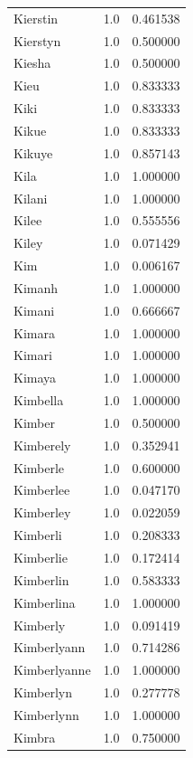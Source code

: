 \documentclass[
  letterpaper,
  DIV=11,
  numbers=noendperiod]{scrreprt}
\begin{document}
\begin{tabular}{lrr}
Kierstin        &   1.0 &   0.461538 \\
Kierstyn        &   1.0 &   0.500000 \\
Kiesha          &   1.0 &   0.500000 \\
Kieu            &   1.0 &   0.833333 \\
Kiki            &   1.0 &   0.833333 \\
Kikue           &   1.0 &   0.833333 \\
Kikuye          &   1.0 &   0.857143 \\
Kila            &   1.0 &   1.000000 \\
Kilani          &   1.0 &   1.000000 \\
Kilee           &   1.0 &   0.555556 \\
Kiley           &   1.0 &   0.071429 \\
Kim             &   1.0 &   0.006167 \\
Kimanh          &   1.0 &   1.000000 \\
Kimani          &   1.0 &   0.666667 \\
Kimara          &   1.0 &   1.000000 \\
Kimari          &   1.0 &   1.000000 \\
Kimaya          &   1.0 &   1.000000 \\
Kimbella        &   1.0 &   1.000000 \\
Kimber          &   1.0 &   0.500000 \\
Kimberely       &   1.0 &   0.352941 \\
Kimberle        &   1.0 &   0.600000 \\
Kimberlee       &   1.0 &   0.047170 \\
Kimberley       &   1.0 &   0.022059 \\
Kimberli        &   1.0 &   0.208333 \\
Kimberlie       &   1.0 &   0.172414 \\
Kimberlin       &   1.0 &   0.583333 \\
Kimberlina      &   1.0 &   1.000000 \\
Kimberly        &   1.0 &   0.091419 \\
Kimberlyann     &   1.0 &   0.714286 \\
Kimberlyanne    &   1.0 &   1.000000 \\
Kimberlyn       &   1.0 &   0.277778 \\
Kimberlynn      &   1.0 &   1.000000 \\
Kimbra          &   1.0 &   0.750000 \\

\end{tabular}
\end{document}
